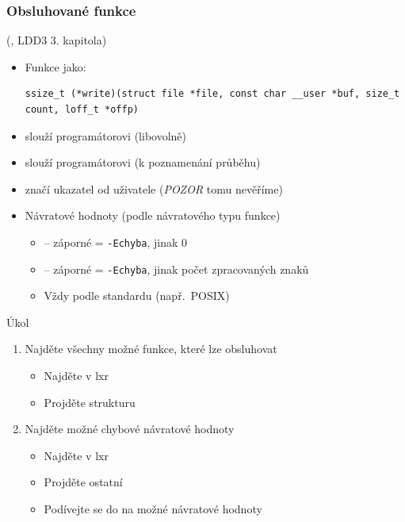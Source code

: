 
\begin{frame}[fragile]
  \frametitle{Obsluhované funkce}

   (, LDD3 3. kapitola)
  \begin{itemize}
  \item Funkce jako:
  \begin{lstlisting}
ssize_t (*write)(struct file *file, const char __user *buf, size_t count, loff_t *offp)
  \end{lstlisting}

  \pause

  \item {} slouží programátorovi (libovolně)
  \item {} slouží programátorovi (k poznamenání průběhu)
  \item {} značí ukazatel od uživatele (\emph{POZOR} tomu nevěříme)

  \pause

  \item Návratové hodnoty (podle návratového typu funkce)
  \begin{itemize}
    \item {} -- záporné = \texttt{-Echyba}, jinak 0
    \item {} -- záporné = \texttt{-Echyba}, jinak počet
      zpracovaných znaků
    \item Vždy podle standardu (např.\ POSIX)
  \end{itemize}
  \end{itemize}
\end{frame}

\begin{frame}{Úkol}

  \begin{enumerate}
  \item Najděte všechny možné funkce, které lze obsluhovat
  \begin{itemize}
    \item Najděte  v lxr
    \item Projděte strukturu
  \end{itemize}

  \item Najděte možné chybové návratové hodnoty
  \begin{itemize}
    \item Najděte  v lxr
    \item Projděte ostatní
    \item Podívejte se do  na možné návratové hodnoty
  \end{itemize}
  \end{enumerate}
\end{frame}

